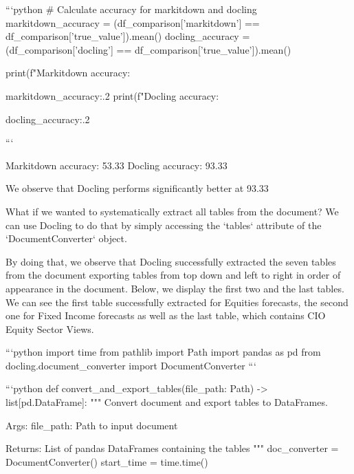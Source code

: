 ```python
# Calculate accuracy for markitdown and docling
markitdown_accuracy = (df_comparison['markitdown'] == df_comparison['true_value']).mean()
docling_accuracy = (df_comparison['docling'] == df_comparison['true_value']).mean()

print(f"Markitdown accuracy: {markitdown_accuracy:.2%
print(f"Docling accuracy: {docling_accuracy:.2%

```

    Markitdown accuracy: 53.33%
    Docling accuracy: 93.33%


We observe that Docling performs significantly better at 93.33%

What if we wanted to systematically extract all tables from the document? We can use Docling to do that by simply accessing the `tables` attribute of the `DocumentConverter` object.

By doing that, we observe that Docling successfully extracted the seven tables from the document exporting tables from top down and left to right in order of appearance in the document.
Below, we display the first two and the last tables. We can see the first table successfully extracted for Equities forecasts, the second one for Fixed Income forecasts as well as the last table, which contains CIO Equity Sector Views.



```python
import time
from pathlib import Path
import pandas as pd
from docling.document_converter import DocumentConverter
```


```python
def convert_and_export_tables(file_path: Path) -> list[pd.DataFrame]:
    """
    Convert document and export tables to DataFrames.
    
    Args:
        file_path: Path to input document
        
    Returns:
        List of pandas DataFrames containing the tables
    """
    doc_converter = DocumentConverter()
    start_time = time.time()
    
}}

